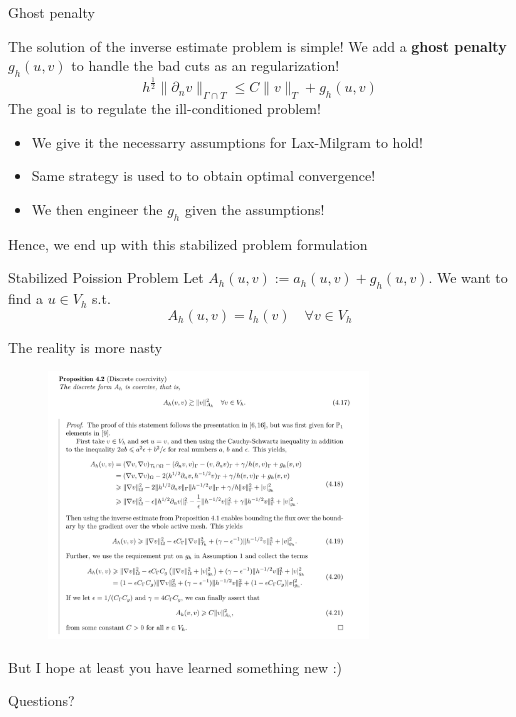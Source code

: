 \begin{frame}{Ghost penalty}

    The solution of the inverse estimate problem is simple! We add a \textbf{ghost penalty} $g_{h}( u,v) $ to handle the bad cuts as an regularization!
    $$h^{\frac{1}{2}} \| \partial _{n} v \|_{ \Gamma \cap T  }^{  } \le C \| v  \|_{  T      }^{  }+ g_{h}( u,v) $$
    The goal is to regulate the ill-conditioned problem!
    \begin{itemize}
        \item We give it the necessarry assumptions for Lax-Milgram to hold!
        \item Same strategy is used to to obtain optimal convergence!
        \item We then engineer the $g_{h}$ given the assumptions!
    \end{itemize}

    Hence, we end up with this stabilized problem formulation

    \begin{block}{Stabilized Poission Problem}
        Let $A_{h}( u,v) := a_{h}( u,v) + g_{h}( u,v)   $.
            We want to find a $u \in V_{h} $ s.t.
            \[
            A_{h}( u,v) = l_{h}( v)  \quad \forall v \in V_{h}
            \]
    \end{block}
\end{frame}

\begin{frame}{ The reality is more nasty}

    \begin{figure}
        \centering
        \includegraphics[width=8.5cm]{figures/reality.png}
    \end{figure}

\end{frame}
\begin{frame}{ }

    \begin{block}{But I hope at least you have learned something new :) }
    \end{block}

\end{frame}

\begin{frame}{ }

    \begin{block}{Questions? }
    \end{block}

\end{frame}
